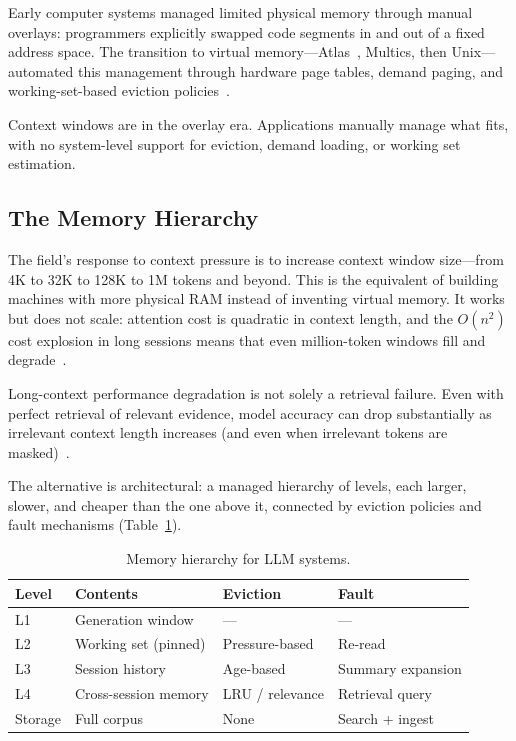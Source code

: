 Early computer systems managed limited physical memory through
manual overlays: programmers explicitly swapped code segments in and
out of a fixed address space. The transition to virtual
memory---Atlas~\citep{kilburn1962one}, Multics, then
Unix---automated this management through hardware page tables,
demand paging, and working-set-based eviction
policies~\citep{denning1968working,denning1970virtual}.

Context windows are in the overlay era. Applications manually
manage what fits, with no system-level support for eviction,
demand loading, or working set estimation.

\subsection{The Memory Hierarchy}
\label{sec:hierarchy}

The field's response to context pressure is to increase context
window size---from 4K to 32K to 128K to 1M tokens and beyond. This
is the equivalent of building machines with more physical RAM
instead of inventing virtual memory. It works but does not scale:
attention cost is quadratic in context length, and the $O(n^2)$ cost
explosion in long sessions means that even million-token windows
fill and degrade~\citep{zeyliger2026quadratic}.

Long-context performance degradation is not solely a retrieval failure.
Even with perfect retrieval of relevant evidence, model accuracy can
drop substantially as irrelevant context length increases (and even when
irrelevant tokens are masked)~\citep{du2025contextlengthhurtsllm}.

The alternative is architectural: a managed hierarchy of levels,
each larger, slower, and cheaper than the one above it, connected by
eviction policies and fault mechanisms (Table~\ref{tab:hierarchy}).

\begin{table}[ht]
\centering
\caption{Memory hierarchy for LLM systems.}
\label{tab:hierarchy}
\small
\begin{tabular}{@{}llll@{}}
\toprule
\textbf{Level} & \textbf{Contents} & \textbf{Eviction} & \textbf{Fault} \\
\midrule
L1 & Generation window & --- & --- \\
L2 & Working set (pinned) & Pressure-based & Re-read \\
L3 & Session history & Age-based & Summary expansion \\
L4 & Cross-session memory & LRU / relevance & Retrieval query \\
Storage & Full corpus & None & Search + ingest \\
\bottomrule
\end{tabular}
\end{table}

